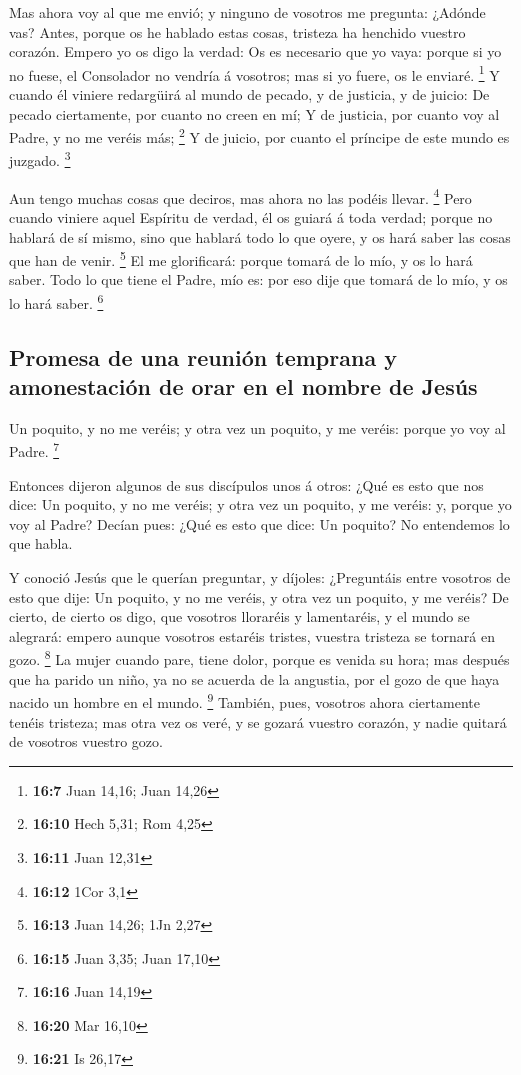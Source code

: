  Mas ahora voy al que me envió; y ninguno de vosotros me
pregunta: ¿Adónde vas?  Antes, porque os he hablado estas
cosas, tristeza ha henchido vuestro corazón.  Empero yo os
digo la verdad: Os es necesario que yo vaya: porque si yo no fuese, el
Consolador no vendría á vosotros; mas si yo fuere, os le enviaré.
\footnote{\textbf{16:7} Juan 14,16; Juan 14,26}  Y cuando él
viniere redargüirá al mundo de pecado, y de justicia, y de juicio:
 De pecado ciertamente, por cuanto no creen en mí;
 Y de justicia, por cuanto voy al Padre, y no me veréis
más; \footnote{\textbf{16:10} Hech 5,31; Rom 4,25}  Y de
juicio, por cuanto el príncipe de este mundo es juzgado. \footnote{\textbf{16:11}
  Juan 12,31}

 Aun tengo muchas cosas que deciros, mas ahora no las
podéis llevar. \footnote{\textbf{16:12} 1Cor 3,1}  Pero
cuando viniere aquel Espíritu de verdad, él os guiará á toda verdad;
porque no hablará de sí mismo, sino que hablará todo lo que oyere, y os
hará saber las cosas que han de venir. \footnote{\textbf{16:13} Juan
  14,26; 1Jn 2,27}  El me glorificará: porque tomará de lo
mío, y os lo hará saber.  Todo lo que tiene el Padre, mío
es: por eso dije que tomará de lo mío, y os lo hará saber. \footnote{\textbf{16:15}
  Juan 3,35; Juan 17,10}

\hypertarget{promesa-de-una-reuniuxf3n-temprana-y-amonestaciuxf3n-de-orar-en-el-nombre-de-jesuxfas}{%
\subsection{Promesa de una reunión temprana y amonestación de orar en el
nombre de
Jesús}\label{promesa-de-una-reuniuxf3n-temprana-y-amonestaciuxf3n-de-orar-en-el-nombre-de-jesuxfas}}

 Un poquito, y no me veréis; y otra vez un poquito, y me
veréis: porque yo voy al Padre. \footnote{\textbf{16:16} Juan 14,19}

 Entonces dijeron algunos de sus discípulos unos á otros:
¿Qué es esto que nos dice: Un poquito, y no me veréis; y otra vez un
poquito, y me veréis: y, porque yo voy al Padre?  Decían
pues: ¿Qué es esto que dice: Un poquito? No entendemos lo que habla.

 Y conoció Jesús que le querían preguntar, y díjoles:
¿Preguntáis entre vosotros de esto que dije: Un poquito, y no me veréis,
y otra vez un poquito, y me veréis?  De cierto, de cierto
os digo, que vosotros lloraréis y lamentaréis, y el mundo se alegrará:
empero aunque vosotros estaréis tristes, vuestra tristeza se tornará en
gozo. \footnote{\textbf{16:20} Mar 16,10}  La mujer cuando
pare, tiene dolor, porque es venida su hora; mas después que ha parido
un niño, ya no se acuerda de la angustia, por el gozo de que haya nacido
un hombre en el mundo. \footnote{\textbf{16:21} Is 26,17} 
También, pues, vosotros ahora ciertamente tenéis tristeza; mas otra vez
os veré, y se gozará vuestro corazón, y nadie quitará de vosotros
vuestro gozo.


